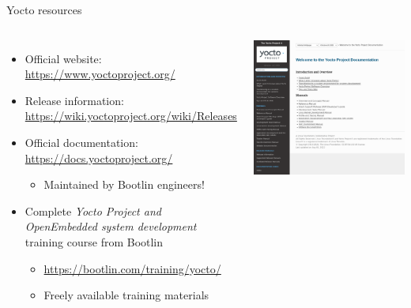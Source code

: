 \begin{frame}{Yocto resources}
  \begin{columns}
    \small
    \begin{itemize}
    \item Official website: \url{https://www.yoctoproject.org/}
    \item Release information:\\
          \url{https://wiki.yoctoproject.org/wiki/Releases}
    \item Official documentation: \url{https://docs.yoctoproject.org/}
      \begin{itemize}
      \item Maintained by Bootlin engineers!
      \end{itemize}
    \item Complete {\em Yocto Project and OpenEmbedded system
        development} training course from Bootlin
      \begin{itemize}
      \item \url{https://bootlin.com/training/yocto/}
      \item Freely available training materials
      \end{itemize}
    \end{itemize}
    \begin{center}
      \includegraphics[height=0.4\textheight]{slides/sysdev-build-systems/yp-docs.png}\\

\end{center}
\end{columns}
\end{frame}
